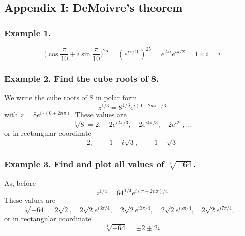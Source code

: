 \documentclass[../main.tex]{subfiles}
\begin{document}
\subsection*{Appendix I: DeMoivre's theorem}
\subsubsection*{Example 1.} 
\begin{equation*}
    \biggl(\cos\frac{\pi}{10} + i \sin\frac{\pi}{10}\biggr)^{25} = (e^{i\pi/10})^{25} = e^{2\pi i}e^{i\pi/2} = 1 \times i = i
\end{equation*}

\subsubsection*{Example 2. Find the cube roots of 8.} We write the cube roots of 8 in polar form
\begin{equation*}
    z^{1/3}=8^{1/3}e^{i(0+2n\pi)/3}
\end{equation*}
with $z=8e^{i\cdot (0+2n\pi )}$. These values are
\begin{equation*}
    \sqrt[3]{8}=2,\quad  2e^{i2\pi/3},\quad2e^{i4\pi/3}, \quad 2e^{i2\pi}, \dots
\end{equation*}
or in rectangular coordinate
\begin{equation*}
    2, \quad-1+i\sqrt{3},\quad -1-\sqrt{3}
\end{equation*}

\subsubsection*{Example 3. Find and plot all values of $\sqrt[4]{-64}$.} As, before
\begin{equation*}
    z^{1/4}=64^{1/4}e^{i(\pi+2n\pi)/4}
\end{equation*}
These values are
\begin{equation*}
    \sqrt[4]{-64}=2\sqrt{2},\quad  2\sqrt{2}e^{i3\pi/4},\quad 2\sqrt{2}e^{i3\pi/4}, \quad 2\sqrt{2}e^{i5\pi/4}, \quad2\sqrt{2}e^{i7\pi/4},\dots
\end{equation*}
or in rectangular coordinate
\begin{equation*}
    \sqrt[4]{-64}=\pm 2\pm 2i
\end{equation*}
\end{document}
